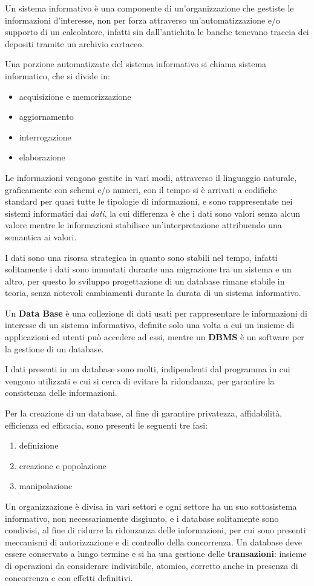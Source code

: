 \documentclass[a4paper,12pt, oneside]{book}
\begin{document}
Un sistema informativo è una componente di un'organizzazione che gestiste le informazioni d'interesse, non per forza attraverso
un'automatizzazione e/o supporto di un calcolatore, infatti sin dall'antichita le banche
tenevano traccia dei depositi tramite un archivio cartaceo.

Una porzione automatizzate del sistema informativo si chiama sistema informatico, che si divide in:
\begin{itemize}
	\item acquisizione e memorizzazione
	\item aggiornamento
	\item interrogazione
	\item elaborazione
\end{itemize}
Le informazioni vengono gestite in vari modi, attraverso il linguaggio naturale, graficamente con schemi e/o numeri,
con il tempo si è arrivati a codifiche standard per quasi tutte le tipologie di informazioni, e sono rappresentate
nei sistemi informatici dai \emph{dati}, la cui differenza è che i dati sono valori senza alcun valore
mentre le informazioni stabilisce un'interpretazione attribuendo una semantica ai valori.

I dati sono una risorsa strategica in quanto sono stabili nel tempo, infatti solitamente i dati sono immutati
durante una migrazione tra un sistema e un altro, per questo lo sviluppo progettazione di un database rimane stabile in teoria,
senza notevoli cambiamenti durante la durata di un sistema informativo.

Un \textbf{Data Base} è una collezione di dati usati per rappresentare le informazioni di interesse di un sistema informativo,
definite solo una volta a cui un insieme di applicazioni ed utenti può accedere ad essi,
mentre un \textbf{DBMS} è un software per la gestione di un database.

I dati presenti in un database sono molti, indipendenti dal programma in cui vengono utilizzati e cui si cerca di evitare
la ridondanza, per garantire la consistenza delle informazioni.

Per la creazione di un database, al fine di garantire privatezza, affidabilità, efficienza ed efficacia,
sono presenti le seguenti tre fasi:
\begin{enumerate}
	\item definizione
	\item creazione e popolazione
	\item manipolazione
\end{enumerate}
Un organizzazione è divisa in vari settori e ogni settore ha un suo sottosistema informativo, non necessariamente disgiunto,
e i database solitamente sono condivisi, al fine di ridurre la ridonzanza delle informazioni, per cui sono presenti
meccanismi di autorizzazione e di controllo della concorrenza.\newline
Un database deve essere conservato a lungo termine e si ha una gestione delle \textbf{transazioni}:
insieme di operazioni da considerare indivisibile, atomico, corretto anche in presenza di concorrenza e con effetti definitivi.
\end{document}
